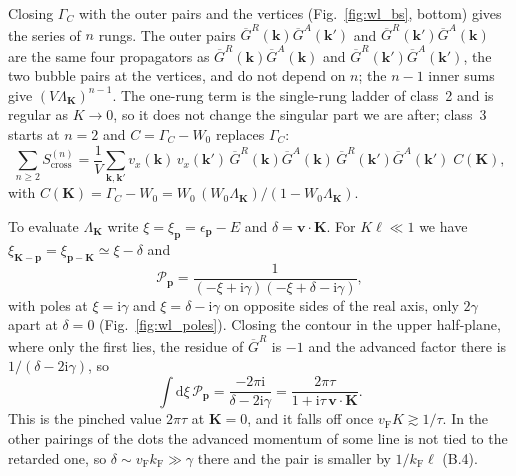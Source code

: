 Closing $\Gamma_C$ with the outer pairs and the vertices (Fig.~\ref{fig:wl_bs}, bottom) gives the series of $n$ rungs. The outer pairs $\overline G^R(\mathbf k)\overline G^A(\mathbf k')$ and $\overline G^R(\mathbf k')\overline G^A(\mathbf k)$ are the same four propagators as $\overline G^R(\mathbf k)\overline G^A(\mathbf k)$ and $\overline G^R(\mathbf k')\overline G^A(\mathbf k')$, the two bubble pairs at the vertices, and do not depend on $n$; the $n-1$ inner sums give $(V\Lambda_{\mathbf K})^{n-1}$. The one-rung term is the single-rung ladder of class~2 and is regular as $K\to0$, so it does not change the singular part we are after; class~3 starts at $n=2$ and $C=\Gamma_C-W_0$ replaces $\Gamma_C$:
\begin{equation}
    \sum_{n\ge2}S^{(n)}_{\mathrm{cross}}=\frac1V\sum_{\mathbf k,\mathbf k'}v_x(\mathbf k)\,v_x(\mathbf k')\,
    \overline G^R(\mathbf k)\overline G^A(\mathbf k)\,\overline G^R(\mathbf k')\overline G^A(\mathbf k')\;C(\mathbf K),
    \label{eq:wl_Cooperon}
\end{equation}
with $C(\mathbf K)=\Gamma_C-W_0=W_0\,(W_0\Lambda_{\mathbf K})/(1-W_0\Lambda_{\mathbf K})$.

To evaluate $\Lambda_{\mathbf K}$ write $\xi=\xi_{\mathbf p}=\epsilon_{\mathbf p}-E$ and $\delta=\mathbf v\!\cdot\!\mathbf K$. For $K\ell\ll1$ we have $\xi_{\mathbf K-\mathbf p}=\xi_{\mathbf p-\mathbf K}\simeq\xi-\delta$ and
\[
\mathcal P_{\mathbf p}=\frac{1}{(-\xi+\mathrm{i}\gamma)(-\xi+\delta-\mathrm{i}\gamma)} ,
\]
with poles at $\xi=\mathrm{i}\gamma$ and $\xi=\delta-\mathrm{i}\gamma$ on opposite sides of the real axis, only $2\gamma$ apart at $\delta=0$ (Fig.~\ref{fig:wl_poles}). Closing the contour in the upper half-plane, where only the first lies, the residue of $\overline G^R$ is $-1$ and the advanced factor there is $1/(\delta-2\mathrm{i}\gamma)$, so
\[
\int\mathrm{d}\xi\,\mathcal P_{\mathbf p}
=\frac{-2\pi\mathrm{i}}{\delta-2\mathrm{i}\gamma}
=\frac{2\pi\tau}{1+\mathrm{i}\tau\,\mathbf v\!\cdot\!\mathbf K}.
\]
This is the pinched value $2\pi\tau$ at $\mathbf K=0$, and it falls off once $v_{\mathrm F}K\gtrsim1/\tau$. In the other pairings of the dots the advanced momentum of some line is not tied to the retarded one, so $\delta\sim v_{\mathrm F}k_{\mathrm F}\gg\gamma$ there and the pair is smaller by $1/k_{\mathrm F}\ell$ (B.4).

